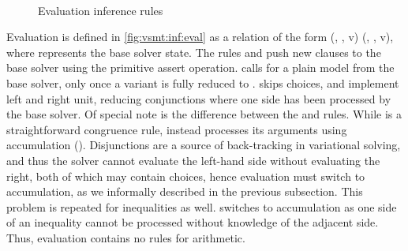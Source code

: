 ~\label{section:vsmt:evaluation}
%
\begin{figure}
  
  \caption{Evaluation inference rules}%
  \label{fig:vsmt:inf:eval}
\end{figure}
%
Evaluation is defined in \autoref{fig:vsmt:inf:eval} as a relation of the form
(\aStore{}, \eStore{}, v) \evaluation{} (\aStore{}, \eStore{}, v), where
\eStore{} represents the base solver state. The rules  and
 push new clauses to the base solver using the primitive assert
operation.  calls for a plain model from the base solver,
only once a variant is fully reduced to \unit{}.  skips
choices,  and  implement left and right unit,
reducing conjunctions where one side has been processed by the base solver. Of
special note is the difference between the  and
 rules. While  is a straightforward congruence
rule,  instead processes its arguments using accumulation
(\accumulation{}). Disjunctions are a source of back-tracking in variational
solving, and thus the solver cannot evaluate the left-hand side without
evaluating the right, both of which may contain choices, hence evaluation must
switch to accumulation, as we informally described in the previous subsection.
This problem is repeated for inequalities as well.  switches
to accumulation as one side of an inequality cannot be processed without
knowledge of the adjacent side. Thus, evaluation contains no rules for
arithmetic.


